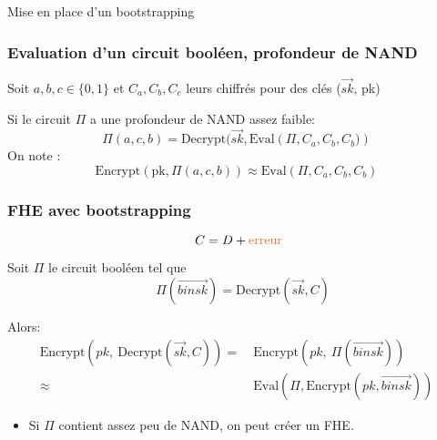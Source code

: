 \documentclass[10pt,xcolor={usenames,dvipsnames}]{beamer}
\begin{document}
\begin{section}{Mise en place d'un bootstrapping}

\begin{frame} 
\frametitle{Evaluation d'un circuit booléen, profondeur de NAND}
Soit $a,b,c\in\{0, 1\}$ et $C_a, C_b, C_c$ leurs chiffrés pour des clés ($\vec{sk}$, pk)
  \begin{center}
      \begin{tikzpicture}[scale = 1, transform shape]
      	
      \end{tikzpicture}
  \end{center}
  Si le circuit $\Pi$ a une profondeur de NAND assez faible:
  \[ \Pi(a,c,b) = \text{Decrypt}(\vec{sk}, \text{Eval}\left(\Pi, C_a, C_b, C_b)\right) \]
  On note :
  \[ \text{Encrypt}\left(\text{pk}, \Pi(a,c,b)\right) \approx \text{Eval}\left(\Pi, C_a, C_b, C_b\right) \]
\end{frame}

 
\begin{frame} 
\frametitle{FHE avec bootstrapping}
\[ C = D + \text{\textcolor{Orange}{erreur}} \]
  \noindent
  \begin{center}
      \begin{tikzpicture}[scale = 1, transform shape]
      	
      \end{tikzpicture}
  \end{center}
  \noindent
  \vspace{-0.7cm}

\pause

Soit $\Pi$ le circuit booléen tel que 
\[\quad\Pi(\overrightarrow{binsk})= \text{Decrypt}\left(\vec{sk}, C\right) \]

\pause
Alors:
\begin{align*}
\text{Encrypt}\left(pk,\: \text{Decrypt}\left(\vec{sk},C\right)\right) 
=&\: \text{Encrypt}\left(pk,\: \Pi(\overrightarrow{binsk})\right) \\
\approx&\: \text{Eval}\left(\Pi, \text{Encrypt}(pk, \overrightarrow{binsk})\right)
\end{align*}
\vspace{-0.5cm}
\begin{itemize}
\item Si $\Pi$ contient assez peu de NAND, on peut créer un FHE.
\end{itemize}


\end{frame}
\end{section}
\end{document}
